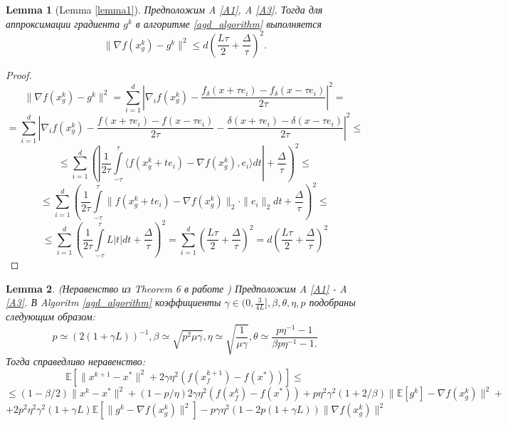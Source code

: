 \documentclass{article}
\newtheorem{lemma}{Lemma}
\begin{document}
\newpage
\appendix
\begin{lemma}[Lemma \ref{lemma1}]\label{lemma1_appendix}
 Предположим A \ref{A1}, A \ref{A3}. Тогда для аппроксимации градиента $g^k$ в алгоритме \ref{agd_algorithm} выполняется
 \begin{equation}
  \|\nabla f(x_g^k) - g^k\|^2 \leqslant d \left(\frac{L\tau}{2} + \frac{\Delta}{\tau}\right)^2.
  \label{approximation_estimate_appendix}
 \end{equation}
\end{lemma}
\begin{proof}
  $$\|\nabla f(x_g^k) - g^k\|^2 = \sum\limits_{i = 1}^d \left|\nabla_i f(x_g^k) -  \frac{f_\delta (x + \tau e_i) - f_\delta (x - \tau e_i)}{2\tau}\right|^2 = $$
  $$=\sum\limits_{i = 1}^d \left|\nabla_i f(x_g^k) -  \frac{f(x + \tau e_i) - f(x - \tau e_i)}{2\tau} - \frac{\delta(x + \tau e_i) - \delta(x - \tau e_i)}{2\tau}\right|^2 \leqslant$$
  $$\leqslant \sum\limits_{i = 1}^d\left( \left|\frac{1}{2\tau} \int\limits_{-\tau}^\tau \langle f(x_g^k + t e_i) - \nabla f(x_g^k), e_i \rangle dt\right| + \frac{\Delta}{\tau}\right)^2 \leqslant$$
  $$\leqslant \sum\limits_{i = 1}^d\left( \frac{1}{2\tau} \int\limits_{-\tau}^\tau \|f(x_g^k + t e_i) - \nabla f(x_g^k)\|_2 \cdot \|e_i\|_2 dt + \frac{\Delta}{\tau}\right)^2 \leqslant$$
  $$\leqslant \sum\limits_{i = 1}^d\left( \frac{1}{2\tau} \int\limits_{-\tau}^\tau L |t| dt + \frac{\Delta}{\tau}\right)^2 = \sum\limits_{i = 1}^d\left( \frac{L\tau}{2} + \frac{\Delta}{\tau} \right)^2 = d \left(\frac{L\tau}{2} + \frac{\Delta}{\tau}\right)^2$$
\end{proof}

\begin{lemma}(Неравенство из Theorem 6 в работе \cite{beznosikov2023order})
Предположим A \ref{A1} - A \ref{A3}. В Algoritm \ref{agd_algorithm} коэффициенты $\gamma \in (0, \frac{3}{4L}], \beta, \theta, \eta, p$ подобраны следующим образом:
\begin{equation}
  p \simeq (2(1 + \gamma L))^{-1}, \beta \simeq \sqrt{p^2 \mu \gamma}, \eta \simeq \sqrt{\frac{1}{\mu\gamma}}, \theta \simeq \frac{p \eta^{-1} - 1}{\beta p \eta^{-1} - 1.}
\end{equation}
Тогда справедливо неравенство:
$$\mathbb{E}[\|x^{k + 1} - x^*\|^2 + 2 \gamma \eta^2 (f(x_f^{k + 1}) - f(x^*))] \leqslant$$
$$\leqslant (1 - \beta / 2) \|x^k - x^*\|^2 + (1 - p/\eta) 2 \gamma \eta^2 (f(x_f^k) - f(x^*)) + p \eta^2 \gamma^2 (1 + 2/\beta) \|\mathbb{E}[g^k] - \nabla f(x_g^k)\|^2 + $$
\begin{equation}
+2 p^2 \eta^2 \gamma^2 (1 + \gamma L) \mathbb{E}[\|g^k - \nabla f(x_g^k)\|^2] - p \gamma \eta^2 (1 - 2p(1 + \gamma L))\|\nabla f(x_g^k)\|^2
\label{theorem_inequality}
\end{equation}
\end{lemma}
\end{document}

